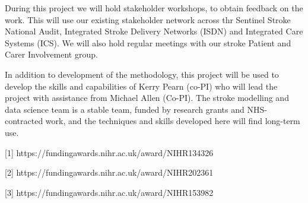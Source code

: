 \begin{markdown}
During this project we will hold stakeholder workshops, to obtain feedback on the work. This will use our existing stakeholder network across thr Sentinel Stroke National Audit, Integrated Stroke Delivery Networks (ISDN) and Integrated Care Systems (ICS). We will also hold regular meetings with our stroke Patient and Carer Involvement group.

In addition to development of the methodology, this project will be used to develop the skills and capabilities of Kerry Pearn (co-PI) who will lead the project with assistance from Michael Allen (Co-PI). The stroke modelling and data science team is a stable team, funded by research grants and NHS-contracted work, and the techniques and skills developed here will find long-term use.

[1] https://fundingawards.nihr.ac.uk/award/NIHR134326

[2] https://fundingawards.nihr.ac.uk/award/NIHR202361

[3] https://fundingawards.nihr.ac.uk/award/NIHR153982
\end{markdown}
